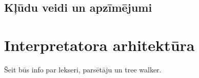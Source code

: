 \documentclass[12pt,a4paper]{report}
\begin{document}
\section{Kļūdu veidi un apzīmējumi}

\chapter{Interpretatora arhitektūra}
\label{chap:arch}

Šeit būs info par lekseri, parsētāju un tree walker.



   
\end{document}
